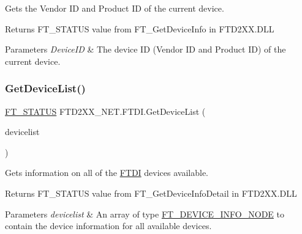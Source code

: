 Gets the Vendor ID and Product ID of the current device. 

\begin{DoxyReturn}{Returns}
F\+T\+\_\+\+S\+T\+A\+T\+US value from F\+T\+\_\+\+Get\+Device\+Info in F\+T\+D2\+X\+X.\+D\+LL
\end{DoxyReturn}

\begin{DoxyParams}{Parameters}
{\em Device\+ID} & The device ID (Vendor ID and Product ID) of the current device.\\
\hline
\end{DoxyParams}
\mbox{\label{class_f_t_d2_x_x___n_e_t_1_1_f_t_d_i_a53b4964fa4eb85d4d36e4f962a65cccb}} 
\subsubsection{\texorpdfstring{GetDeviceList()}{GetDeviceList()}}
{\footnotesize\ttfamily \mbox{\hyperlink{class_f_t_d2_x_x___n_e_t_1_1_f_t_d_i_aabe20ad905cc4ccc1e35dd5b877d9a83}{F\+T\+\_\+\+S\+T\+A\+T\+US}} F\+T\+D2\+X\+X\+\_\+\+N\+E\+T.\+F\+T\+D\+I.\+Get\+Device\+List (\begin{DoxyParamCaption}\item[{\mbox{\hyperlink{class_f_t_d2_x_x___n_e_t_1_1_f_t_d_i_1_1_f_t___d_e_v_i_c_e___i_n_f_o___n_o_d_e}{F\+T\+\_\+\+D\+E\+V\+I\+C\+E\+\_\+\+I\+N\+F\+O\+\_\+\+N\+O\+DE}} \mbox{[}$\,$\mbox{]}}]{devicelist }\end{DoxyParamCaption})}



Gets information on all of the \mbox{\hyperlink{class_f_t_d2_x_x___n_e_t_1_1_f_t_d_i}{F\+T\+DI}} devices available. 

\begin{DoxyReturn}{Returns}
F\+T\+\_\+\+S\+T\+A\+T\+US value from F\+T\+\_\+\+Get\+Device\+Info\+Detail in F\+T\+D2\+X\+X.\+D\+LL
\end{DoxyReturn}

\begin{DoxyParams}{Parameters}
{\em devicelist} & An array of type \mbox{\hyperlink{class_f_t_d2_x_x___n_e_t_1_1_f_t_d_i_1_1_f_t___d_e_v_i_c_e___i_n_f_o___n_o_d_e}{F\+T\+\_\+\+D\+E\+V\+I\+C\+E\+\_\+\+I\+N\+F\+O\+\_\+\+N\+O\+DE}} to contain the device information for all available devices.\\
\hline
\end{DoxyParams}

